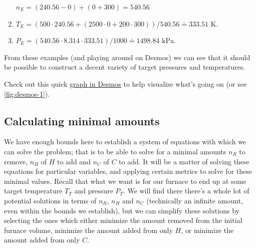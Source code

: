 \documentclass{article}
\begin{document}
\begin{example*}
\begin{example*}[$n_R=0$, $n_H=0$, and $n_C=300$]
\begin{enumerate}[label=(\alph*)]
\begin{math}
                    n_E=(240.56-0)+(0+300)=540.56
                \end{math}
            \item
                \begin{math}
                    T_E
                    = (500\cdot 240.56+(2500\cdot 0+200\cdot 300))/540.56
                    \doteq 333.51\text{ K}.
                \end{math}
            \item
                \begin{math}
                    P_E
                    = (540.56\cdot 8.314\cdot 333.51)/1000
                    \doteq 1498.84\text{ kPa}.
                \end{math}
        \end{enumerate}
    \end{example*}
    From these examples (and playing around on Desmos) we can see that it should be possible to
    construct a decent variety of target pressures and temperatures.

    Check out this quick
    \href{https://www.desmos.com/calculator/clfts6kzwk}{graph in Desmos} to help visualize
    what's going on (or see \cref{fig:desmos-1}).
\end{example*}


\subsection{Calculating minimal amounts}

We have enough bounds here to establish a system of equations with which we can solve the problem;
that is to be able to solve for a minimal amounts $n_R$ to remove, $n_H$ of $H$ to add and $n_C$ of
$C$ to add. It will be a matter of solving these equations for particular variables, and applying
certain metrics to solve for these minimal values.
Recall that what we want is for our furnace to end up at some target temperature $T_T$ and pressure
$P_T$. We will find there there's a whole lot of potential solutions in terms of $n_R$, $n_H$ and
$n_C$ (technically an infinite amount, even within the bounds we establish), but we can simplify
these solutions by selecting the ones which either minimize the amount removed from the initial
furnace volume, minimize the amount added from only $H$, or minimize the amount added from only $C$.
\end{document}

